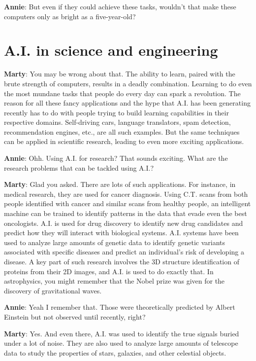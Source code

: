 \documentclass{../template/texnote}
\begin{document}
\textbf{Annie}: But even if they could achieve these tasks, wouldn't that make these computers only as bright as a five-year-old? 

\section{A.I. in science and engineering}
\noindent


\textbf{Marty}: You may be wrong about that. The ability to learn, paired with the brute strength of computers, results in a deadly combination. Learning to do even the most mundane tasks that people do every day can spark a revolution. The reason for all these fancy applications and the hype that A.I. has been generating recently has to do with people trying to build learning capabilities in their respective domains. Self-driving cars, language translators, spam detection, recommendation engines, etc., are all such examples. But the same techniques can be applied in scientific research, leading to even more exciting applications. 

\textbf{Annie}: Ohh. Using A.I. for research? That sounds exciting. What are the research problems that can be tackled using A.I.?

\textbf{Marty}: Glad you asked. There are lots of such applications. For instance, in medical research, they are used for cancer diagnosis. Using C.T. scans from both people identified with cancer and similar scans from healthy people, an intelligent machine can be trained to identify patterns in the data that evade even the best oncologists. A.I. is used for drug discovery to identify new drug candidates and predict how they will interact with biological systems. A.I. systems have been used to analyze large amounts of genetic data to identify genetic variants associated with specific diseases and predict an individual's risk of developing a disease. A key part of such research involves the 3D structure identification of proteins from their 2D images, and A.I. is used to do exactly that. In astrophysics, you might remember that the Nobel prize was given for the discovery of gravitational waves. 

\textbf{Annie}: Yeah I remember that. Those were theoretically predicted by Albert Einstein but not observed until recently, right?

\textbf{Marty}: Yes. And even there, A.I. was used to identify the true signals buried under a lot of noise. They are also used to analyze large amounts of telescope data to study the properties of stars, galaxies, and other celestial objects. 
\end{document}
